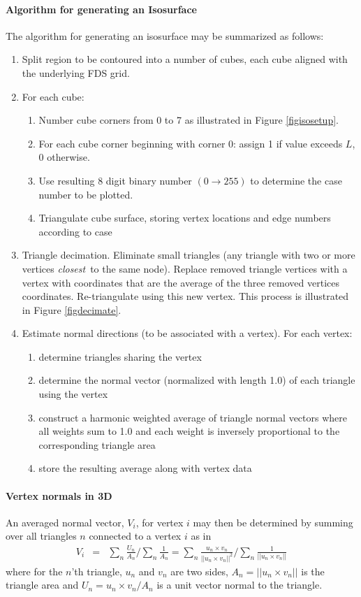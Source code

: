 \documentclass[11pt,twoside]{book}
\begin{document}
\paragraph{Algorithm for generating an Isosurface} The algorithm for generating an isosurface may be summarized as follows:
\begin{enumerate}
\item Split region to be contoured into a number of cubes, each cube aligned with the underlying FDS grid.
\item For  each cube:
\begin{enumerate}
\item Number cube corners from 0 to 7 as illustrated in Figure \ref{figisosetup}.
\item For each cube corner beginning with corner 0: assign 1 if value exceeds $L$, 0 otherwise.
\item Use resulting 8 digit binary number $(0\rightarrow 255)$ to determine the case number to be plotted.
\item Triangulate cube surface, storing vertex locations and edge numbers according to case
\end{enumerate}
\item Triangle decimation.  Eliminate small triangles (any triangle with two or more vertices {\em closest}\ to the same node).
Replace removed triangle vertices with a vertex with coordinates that are the average of the three removed vertices coordinates.  Re-triangulate using this new vertex.  This process is illustrated in Figure \ref{figdecimate}.
\item Estimate normal directions (to be associated with a vertex).  For each vertex:
\begin{enumerate}
\item determine triangles sharing the vertex
\item determine the normal vector (normalized with length 1.0) of each triangle using the vertex
\item construct a harmonic weighted average of triangle normal vectors where all weights sum to 1.0 and each weight is inversely proportional to the corresponding triangle area
\item store the resulting average along with vertex data
\end{enumerate}
\end{enumerate}

\paragraph{Vertex normals in 3D} An averaged normal vector, $V_i$, for vertex $i$ may then be determined by summing over all triangles $n$ connected to a vertex $i$ as in
\begin{eqnarray*}
V_{i}&=&\sum_n\frac{U_n}{A_n}/\sum_n\frac{1}{A_n}
=\sum_n\frac{u_n\times v_n}{||u_n\times v_n||^2}/\sum_n\frac{1}{||u_n\times v_n||}
\end{eqnarray*}
where for the $n$'th triangle, $u_n$ and $v_n$ are two sides, $A_n=||u_n\times v_n||$ is the triangle area and $U_n=u_n\times v_n/A_n$ is a unit vector normal to the triangle.
\end{document}
